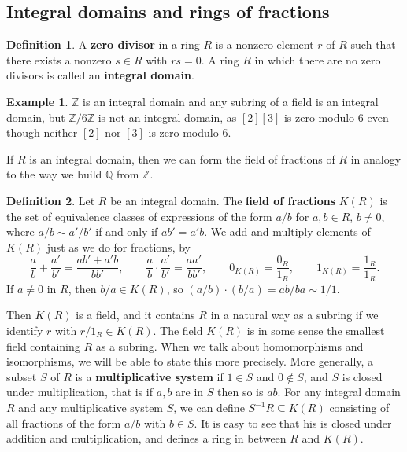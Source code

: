 \documentclass{article}
\newcommand{\Z}{\mathbb{Z}}
\newcommand{\Q}{\mathbb{Q}}
\newcommand{\rb}[1]{\left( #1 \right)}
\renewcommand{\sb}[1]{\left[ #1 \right]}
\theoremstyle{definition}\newtheorem{definition}{Definition}[subsection]
\theoremstyle{definition}\newtheorem{remark}[definition]{Remark}
\theoremstyle{definition}\newtheorem*{example}{Example}
\theoremstyle{definition}\newtheorem*{note}{Note}
\begin{document}

\subsection{Integral domains and rings of fractions}

\begin{definition}
A \textbf{zero divisor} in a ring $ R $ is a nonzero element $ r $ of $ R $ such that there exists a nonzero $ s \in R $ with $ rs = 0 $. A ring $ R $ in which there are no zero divisors is called an \textbf{integral domain}.
\end{definition}

\begin{example}
$ \Z $ is an integral domain and any subring of a field is an integral domain, but $ \Z / 6\Z $ is not an integral domain, as $ \sb{2}\sb{3} $ is zero modulo $ 6 $ even though neither $ \sb{2} $ nor $ \sb{3} $ is zero modulo $ 6 $.
\end{example}

If $ R $ is an integral domain, then we can form the field of fractions of $ R $ in analogy to the way we build $ \Q $ from $ \Z $.

\begin{definition}
Let $ R $ be an integral domain. The \textbf{field of fractions} $ K\rb{R} $ is the set of equivalence classes of expressions of the form $ a / b $ for $ a, b \in R $, $ b \ne 0 $, where $ a / b \sim a' / b' $ if and only if $ ab' = a'b $. We add and multiply elements of $ K\rb{R} $ just as we do for fractions, by
$$ \dfrac{a}{b} + \dfrac{a'}{b'} = \dfrac{ab' + a'b}{bb'}, \qquad \dfrac{a}{b} \cdot \dfrac{a'}{b'} = \dfrac{aa'}{bb'}, \qquad 0_{K\rb{R}} = \dfrac{0_R}{1_R}, \qquad 1_{K\rb{R}} = \dfrac{1_R}{1_R}. $$
If $ a \ne 0 $ in $ R $, then $ b / a \in K\rb{R} $, so $ \rb{a / b} \cdot \rb{b / a} = ab / ba \sim 1 / 1 $.
\end{definition}

Then $ K\rb{R} $ is a field, and it contains $ R $ in a natural way as a subring if we identify $ r $ with $ r / 1_R \in K\rb{R} $. The field $ K\rb{R} $ is in some sense the smallest field containing $ R $ as a subring. When we talk about homomorphisms and isomorphisms, we will be able to state this more precisely. More generally, a subset $ S $ of $ R $ is a \textbf{multiplicative system} if $ 1 \in S $ and $ 0 \notin S $, and $ S $ is closed under multiplication, that is if $ a, b $ are in $ S $ then so is $ ab $. For any integral domain $ R $ and any multiplicative system $ S $, we can define $ S^{-1}R \subseteq K\rb{R} $ consisting of all fractions of the form $ a / b $ with $ b \in S $. It is easy to see that his is closed under addition and multiplication, and defines a ring in between $ R $ and $ K\rb{R} $.
\end{document}
